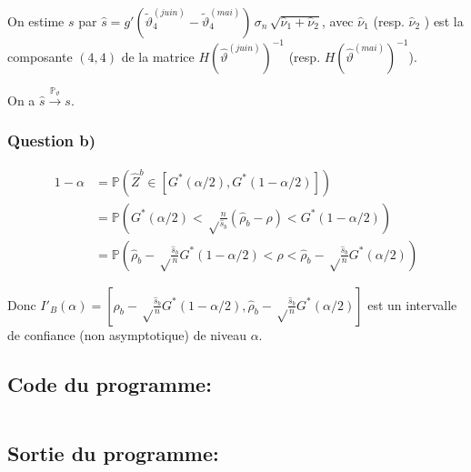 \documentclass{article}
\newcommand{\Q}[1]{\subsubsection*{Question #1}}
\begin{document}
On estime $s$ par  $\hat s = g'( \tilde \vartheta^{(juin)}_4 -  \tilde \vartheta^{(mai)}_4)  \, \sigma_n \, \sqrt{\hat \nu_1 + \hat \nu_2}$, avec
$\hat \nu_1$ (resp. $\hat \nu_2$ ) est la composante $(4,4)$ de la matrice $H(\hat \vartheta^{(juin)})^{-1}$ (resp. $H(\hat \vartheta^{(mai)})^{-1}$).

On a $\hat s \overset {\mathbb{P}_{\vartheta}} \longrightarrow s$.

\Q{ b) }
\begin{align*}
1 - \alpha &= \mathbb{P}\left(\hat Z ^ b \in \left[G^*(\alpha/2), G^*(1-\alpha/2)\right]\right) \\
&= \mathbb{P}\left(G^*(\alpha/2) < \sqrt \frac{n}{\hat s_b}(\hat \rho_b - \rho) < G^*(1-\alpha/2)\right) \\
&= \mathbb{P}\left(\hat \rho_b - \sqrt \frac{\hat s_b}{n}G^*(1-\alpha/2) <  \rho < \hat \rho_b - \sqrt \frac{\hat s_b}{n}G^*(\alpha/2)\right)
\end{align*}

Donc $ I'_B(\alpha) = [ \rho_b - \sqrt \frac{\hat s_b}{n}G^*(1-\alpha/2), \hat \rho_b - \sqrt \frac{\hat s_b}{n}G^*(\alpha/2)]$ est un intervalle de confiance (non asymptotique) de niveau $\alpha$.

\subsection*{Code du programme:}
\inputminted{r}{script.R}

\subsection*{Sortie du programme:}
\inputminted{r}{sortie.R}
\end{document}
